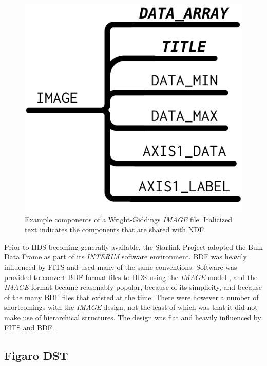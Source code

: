 \documentclass[final,authoryear,5p,times,twocolumn]{elsarticle}
\begin{document}
\begin{figure}[t]
\begin{center}
\includegraphics[width=0.5\columnwidth]{model-image}
\end{center}
\caption{Example components of a Wright-Giddings \emph{IMAGE}
  file.  Italicized text indicates the components that are shared with NDF.}
\label{fig:image}
\end{figure}

Prior to HDS becoming generally available, the Starlink Project adopted
the Bulk Data Frame \citep[BDF;][]{1980SPIE..264...70P,SUN4} as part
of its \emph{INTERIM} software environment.  BDF was heavily influenced
by FITS and used many of the same conventions.  Software was provided
to convert BDF format files to HDS using the \emph{IMAGE} model
\citep{SUN96}, and
the \emph{IMAGE} format became reasonably popular, because of its
simplicity, and because of the many BDF files that existed at the time.
There were however
a number of shortcomings with the \emph{IMAGE} design, not the least of which was
that it did not make use of hierarchical structures. The design was
flat and heavily influenced by FITS and BDF.

\subsection{Figaro DST}
\label{app:figaro}
\end{document}

